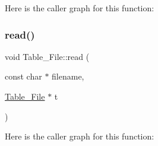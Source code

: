 Here is the caller graph for this function\+:
\mbox{\label{namespace_table___file_aa8bf3033f2d73225dca1ca2b453020e6}} 
\subsubsection{\texorpdfstring{read()}{read()}}
{\footnotesize\ttfamily void Table\+\_\+\+File\+::read (\begin{DoxyParamCaption}\item[{const char $\ast$}]{filename,  }\item[{\mbox{\hyperlink{struct_table___file_1_1_table___file}{Table\+\_\+\+File}} $\ast$}]{t }\end{DoxyParamCaption})}

Here is the caller graph for this function\+:
